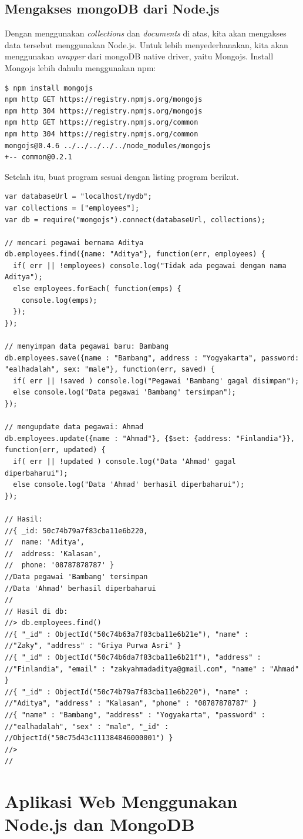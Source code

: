 \subsection{Mengakses mongoDB dari Node.js}

Dengan menggunakan \textit{collections} dan \textit{documents} di atas, kita akan mengakses data tersebut menggunakan Node.js. Untuk lebih menyederhanakan, kita akan menggunakan \textit{wrapper} dari mongoDB native driver, yaitu Mongojs. Install Mongojs lebih dahulu menggunakan npm:

\lstset{language=bash,caption=Instalasi driver mongoDB}
\begin{lstlisting}
$ npm install mongojs
npm http GET https://registry.npmjs.org/mongojs
npm http 304 https://registry.npmjs.org/mongojs
npm http GET https://registry.npmjs.org/common
npm http 304 https://registry.npmjs.org/common
mongojs@0.4.6 ../../../../../node_modules/mongojs
+-- common@0.2.1
\end{lstlisting}

Setelah itu, buat program sesuai dengan listing program berikut.

\lstset{language=bash,caption=Mengakses mongoDB dari Node.js}
\begin{lstlisting}
var databaseUrl = "localhost/mydb";
var collections = ["employees"];
var db = require("mongojs").connect(databaseUrl, collections);

// mencari pegawai bernama Aditya
db.employees.find({name: "Aditya"}, function(err, employees) {
  if( err || !employees) console.log("Tidak ada pegawai dengan nama Aditya");
  else employees.forEach( function(emps) {
    console.log(emps);
  });
});

// menyimpan data pegawai baru: Bambang
db.employees.save({name : "Bambang", address : "Yogyakarta", password: "ealhadalah", sex: "male"}, function(err, saved) {
  if( err || !saved ) console.log("Pegawai 'Bambang' gagal disimpan");
  else console.log("Data pegawai 'Bambang' tersimpan");
});

// mengupdate data pegawai: Ahmad
db.employees.update({name : "Ahmad"}, {$set: {address: "Finlandia"}}, function(err, updated) {
  if( err || !updated ) console.log("Data 'Ahmad' gagal diperbaharui");
  else console.log("Data 'Ahmad' berhasil diperbaharui");
});

// Hasil:
//{ _id: 50c74b79a7f83cba11e6b220,
//  name: 'Aditya',
//  address: 'Kalasan',
//  phone: '08787878787' }
//Data pegawai 'Bambang' tersimpan
//Data 'Ahmad' berhasil diperbaharui
//
// Hasil di db:
//> db.employees.find()
//{ "_id" : ObjectId("50c74b63a7f83cba11e6b21e"), "name" : 
//"Zaky", "address" : "Griya Purwa Asri" }
//{ "_id" : ObjectId("50c74b6da7f83cba11e6b21f"), "address" :
//"Finlandia", "email" : "zakyahmadaditya@gmail.com", "name" : "Ahmad" }
//{ "_id" : ObjectId("50c74b79a7f83cba11e6b220"), "name" :
//"Aditya", "address" : "Kalasan", "phone" : "08787878787" }
//{ "name" : "Bambang", "address" : "Yogyakarta", "password" : 
//"ealhadalah", "sex" : "male", "_id" : 
//ObjectId("50c75d43c111384846000001") }
//> 
//  
\end{lstlisting}

\section{Aplikasi Web Menggunakan Node.js dan MongoDB}

